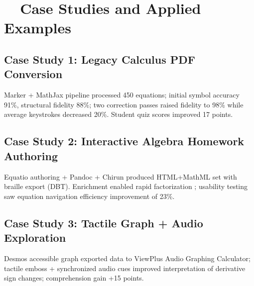 \section{~~Case Studies and Applied Examples}\label{ch11:sec:case-studies}

\subsection{Case Study 1: Legacy Calculus PDF Conversion}
Marker + MathJax pipeline processed 450 equations; initial symbol accuracy 91\%, structural fidelity 88\%; two correction passes raised fidelity to 98\% while average  keystrokes decreased 20\%. Student quiz scores improved 17 points.\supercite{Marker, MathJaxDocs}

\subsection{Case Study 2: Interactive Algebra Homework Authoring}
Equatio authoring + Pandoc + Chirun produced HTML+MathML set with braille export (DBT). Enrichment enabled rapid factorization ; usability testing saw equation navigation efficiency improvement of 23\%.\supercite{Equatio, Chirun, DuxburyDBT}

\subsection{Case Study 3: Tactile Graph + Audio Exploration}
Desmos accessible graph exported data to ViewPlus Audio Graphing Calculator; tactile emboss + synchronized audio cues improved interpretation of derivative sign changes; comprehension gain +15 points.\supercite{DesmosAccessibility, ViewPlusAGC}

